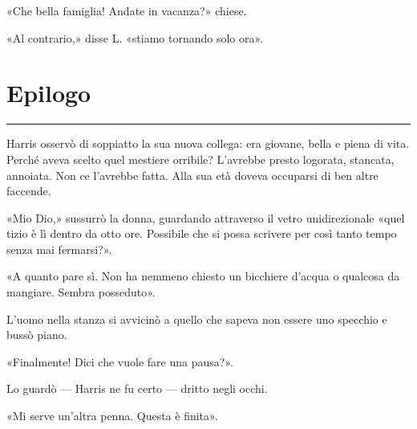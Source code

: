 \documentclass[a4paper,11pt,oneside,openright,final]{memoir}
\begin{document}
«Che bella famiglia! Andate in vacanza?» chiese.

«Al contrario,» disse L. «stiamo tornando solo ora».

\backmatter

\chapter{Epilogo}

\plainbreak{1}

Harris osservò di soppiatto la sua nuova collega: era giovane, bella e piena
di vita. Perché aveva scelto quel mestiere orribile? L'avrebbe presto logorata,
stancata, annoiata. Non ce l'avrebbe fatta. Alla sua età doveva occuparsi di ben
altre faccende.

«Mio Dio,» sussurrò la donna, guardando attraverso il vetro unidirezionale «quel
tizio è lì dentro da otto ore. Possibile che si possa scrivere per così tanto
tempo senza mai fermarsi?».

«A quanto pare sì. Non ha nemmeno chiesto un bicchiere d'acqua o qualcosa da
mangiare. Sembra posseduto».

L'uomo nella stanza si avvicinò a quello che sapeva non essere uno specchio e
bussò piano.

«Finalmente! Dici che vuole fare una pausa?».

Lo guardò --- Harris ne fu certo --- dritto negli occhi.

«Mi serve un'altra penna. Questa è finita».

\clearpage

\tableofcontents
\end{document}
